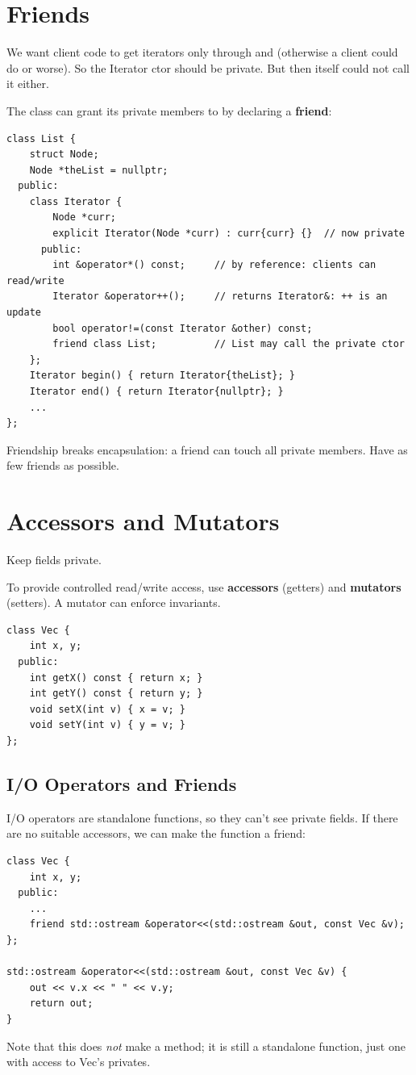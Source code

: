 \section{Friends}
We want client code to get iterators only through  and
 (otherwise a client could do  or
worse). So the Iterator ctor should be private. But then  itself
could not call it either.

The  class can grant its private members to  by
declaring  a \textbf{friend}:
\begin{lstlisting}[style=cpp]
class List {
    struct Node;
    Node *theList = nullptr;
  public:
    class Iterator {
        Node *curr;
        explicit Iterator(Node *curr) : curr{curr} {}  // now private
      public:
        int &operator*() const;     // by reference: clients can read/write
        Iterator &operator++();     // returns Iterator&: ++ is an update
        bool operator!=(const Iterator &other) const;
        friend class List;          // List may call the private ctor
    };
    Iterator begin() { return Iterator{theList}; }
    Iterator end() { return Iterator{nullptr}; }
    ...
};
\end{lstlisting}

\begin{important}[Friendship]
Friendship breaks encapsulation: a friend can touch all private members. Have
as few friends as possible.
\end{important}

\section{Accessors and Mutators}
\begin{important}[Advice]
Keep fields private.
\end{important}
To provide controlled read/write access, use \textbf{accessors} (getters) and
\textbf{mutators} (setters). A mutator can enforce invariants.
\begin{lstlisting}[style=cpp]
class Vec {
    int x, y;
  public:
    int getX() const { return x; }
    int getY() const { return y; }
    void setX(int v) { x = v; }
    void setY(int v) { y = v; }
};
\end{lstlisting}

\subsection{I/O Operators and Friends}
I/O operators are standalone functions, so they can't see private fields. If
there are no suitable accessors, we can make the function a friend:
\begin{lstlisting}[style=cpp]
class Vec {
    int x, y;
  public:
    ...
    friend std::ostream &operator<<(std::ostream &out, const Vec &v);
};

std::ostream &operator<<(std::ostream &out, const Vec &v) {
    out << v.x << " " << v.y;
    return out;
}
\end{lstlisting}
Note that this does \emph{not} make  a method; it is still a
standalone function, just one with access to Vec's privates.


